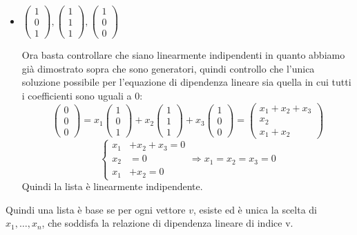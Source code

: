 \documentclass[a4paper,12pt]{article}
\begin{document}
\begin{itemize}
		\item $\begin{pmatrix} 1 \\ 0 \\ 1 \end{pmatrix}, \begin{pmatrix} 1 \\ 1 \\ 1 \end{pmatrix}, \begin{pmatrix} 1 \\ 0 \\ 0 \end{pmatrix}$
		
		Ora basta controllare che siano linearmente indipendenti in quanto abbiamo già dimostrato sopra che sono generatori, quindi controllo che l'unica soluzione possibile per l'equazione di dipendenza lineare sia quella in cui tutti i coefficienti sono uguali a 0:
		\[ \begin{pmatrix} 0 \\ 0 \\ 0 \end{pmatrix} = x_1 \begin{pmatrix} 1 \\ 0 \\ 1 \end{pmatrix} + x_2 \begin{pmatrix} 1 \\ 1 \\ 1 \end{pmatrix} + x_3 \begin{pmatrix} 1 \\ 0 \\ 0 \end{pmatrix} = \begin{pmatrix} x_1 + x_2 + x_3 \\ x_2 \\ x_1 + x_2 \end{pmatrix}\]
		\[\left\{\begin{aligned}
			x_1 & + x_2 + x_3 = 0 \\
			x_2 & = 0 \\
			x_1 & + x_2 = 0
		\end{aligned}\right. \Rightarrow x_1 = x_2 = x_3 = 0\]
		Quindi la lista è linearmente indipendente.
	\end{itemize}
	
	Quindi una lista è base se per ogni vettore $v$, esiste ed è unica la scelta di $x_1, \dots, x_n$, che soddisfa la relazione di dipendenza lineare di indice v.
	
\end{document}
